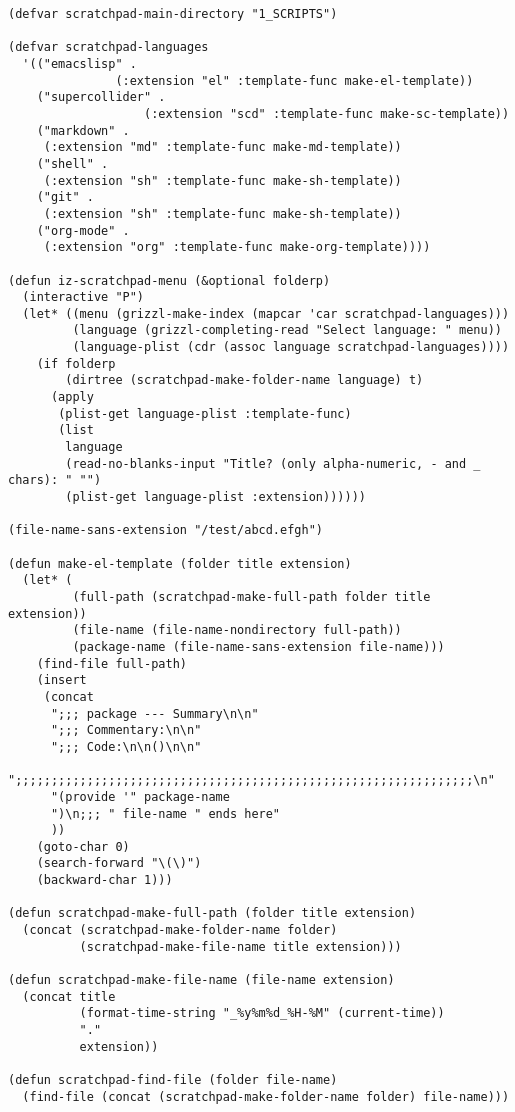 \documentclass[nofonts]{tufte-handout}
\begin{document}
\begin{verbatim}
(defvar scratchpad-main-directory "1_SCRIPTS")

(defvar scratchpad-languages
  '(("emacslisp" .
               (:extension "el" :template-func make-el-template))
    ("supercollider" .
                   (:extension "scd" :template-func make-sc-template))
    ("markdown" .
     (:extension "md" :template-func make-md-template))
    ("shell" .
     (:extension "sh" :template-func make-sh-template))
    ("git" .
     (:extension "sh" :template-func make-sh-template))
    ("org-mode" .
     (:extension "org" :template-func make-org-template))))

(defun iz-scratchpad-menu (&optional folderp)
  (interactive "P")
  (let* ((menu (grizzl-make-index (mapcar 'car scratchpad-languages)))
         (language (grizzl-completing-read "Select language: " menu))
         (language-plist (cdr (assoc language scratchpad-languages))))
    (if folderp
        (dirtree (scratchpad-make-folder-name language) t)
      (apply
       (plist-get language-plist :template-func)
       (list
        language
        (read-no-blanks-input "Title? (only alpha-numeric, - and _ chars): " "")
        (plist-get language-plist :extension))))))

(file-name-sans-extension "/test/abcd.efgh")

(defun make-el-template (folder title extension)
  (let* (
         (full-path (scratchpad-make-full-path folder title extension))
         (file-name (file-name-nondirectory full-path))
         (package-name (file-name-sans-extension file-name)))
    (find-file full-path)
    (insert
     (concat
      ";;; package --- Summary\n\n"
      ";;; Commentary:\n\n"
      ";;; Code:\n\n()\n\n"
      ";;;;;;;;;;;;;;;;;;;;;;;;;;;;;;;;;;;;;;;;;;;;;;;;;;;;;;;;;;;;;;;;\n"
      "(provide '" package-name
      ")\n;;; " file-name " ends here"
      ))
    (goto-char 0)
    (search-forward "\(\)")
    (backward-char 1)))

(defun scratchpad-make-full-path (folder title extension)
  (concat (scratchpad-make-folder-name folder)
          (scratchpad-make-file-name title extension)))

(defun scratchpad-make-file-name (file-name extension)
  (concat title
          (format-time-string "_%y%m%d_%H-%M" (current-time))
          "."
          extension))

(defun scratchpad-find-file (folder file-name)
  (find-file (concat (scratchpad-make-folder-name folder) file-name)))


\end{verbatim}
\end{document}
